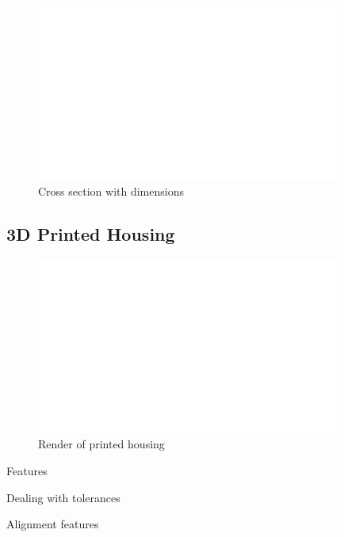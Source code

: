 \begin{figure}[h!]\centering \includegraphics[width=10cm,draft]{figures/foo.png}
      \caption{Cross section with dimensions}
\end{figure}


\clearpage
\subsection{3D Printed Housing}

\begin{figure}[h!]\centering \includegraphics[width=10cm,draft]{figures/foo.png}
      \caption{Render of printed housing}
\end{figure}

Features

Dealing with tolerances

Alignment features


\clearpage
